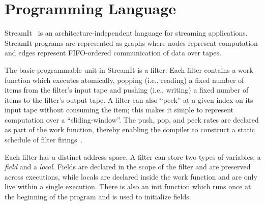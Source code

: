 \documentclass[11pt, letterpaper, onecolumn]{article}
\begin{document}

\section{Programming Language}
\label{sec:pl}

StreamIt~\cite{streamitcc} is an architecture-independent language for
streaming applications.   StreamIt programs are  represented as graphs
where  nodes represent  computation and  edges  represent FIFO-ordered
communication  of data  over tapes.  

The  basic programmable  unit in  StreamIt is  a filter.   Each filter
contains  a work  function which  executes atomically,  popping (i.e.,
reading)  a fixed number  of items  from the  filter's input  tape and
pushing (i.e., writing) a fixed number of items to the filter's output
tape.  A filter  can also ``peek'' at a given index  on its input tape
without  consuming  the  item;  this  makes  it  simple  to  represent
computation over a ``sliding-window''.   The push, pop, and peek rates
are  declared as  part  of  the work  function,  thereby enabling  the
compiler    to    construct    a    static    schedule    of    filter
firings~\cite{lee87static}.

Each filter has a distinct address space.  A filter can store two
types of variables: a {\it field} and a {\it local}.  Fields are
declared in the scope of the filter and are preserved across
executions, while locals are declared inside the work function and are
only live within a single execution.  There is also an init function
which runs once at the beginning of the program and is used to
initialize fields.
\end{document}
